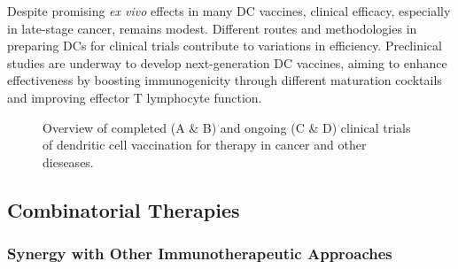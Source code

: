 \documentclass[
]{article}
\begin{document}
Despite promising \emph{ex vivo} effects in many DC vaccines, clinical
efficacy, especially in late-stage cancer, remains modest. Different
routes and methodologies in preparing DCs for clinical trials contribute
to variations in efficiency. Preclinical studies are underway to develop
next-generation DC vaccines, aiming to enhance effectiveness by boosting
immunogenicity through different maturation cocktails and improving
effector T lymphocyte function.

\begin{figure}


\caption{\label{fig-clin}Overview of completed (A \& B) and ongoing (C
\& D) clinical trials of dendritic cell vaccination for therapy in
cancer and other dieseases.}

\end{figure}%

\subsection{Combinatorial Therapies}\label{combinatorial-therapies}

\subsubsection{Synergy with Other Immunotherapeutic
Approaches}\label{synergy-with-other-immunotherapeutic-approaches}
\end{document}
